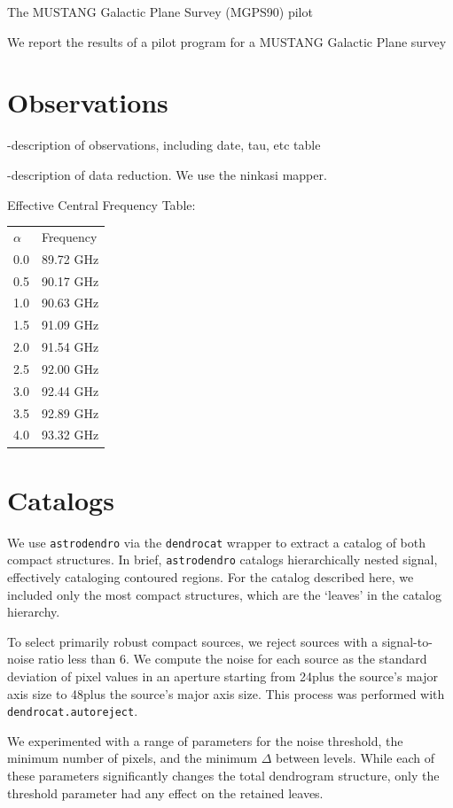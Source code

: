 \documentclass[twocolumn]{aastex62}
\begin{document}
The MUSTANG Galactic Plane Survey (MGPS90) pilot

We report the results of a pilot program for a MUSTANG Galactic Plane survey

\section{Observations}

-description of observations, including date, tau, etc table

-description of data reduction.  We use the ninkasi mapper.


Effective Central Frequency Table:

\begin{tabular}{ll}
$\alpha$ & Frequency \\
0.0 & 89.72 GHz \\
0.5 & 90.17 GHz \\
1.0 & 90.63 GHz \\
1.5 & 91.09 GHz \\
2.0 & 91.54 GHz \\
2.5 & 92.00 GHz \\
3.0 & 92.44 GHz \\
3.5 & 92.89 GHz \\
4.0 & 93.32 GHz 
\end{tabular}

\section{Catalogs}

We use \texttt{astrodendro} via the \texttt{dendrocat} wrapper to extract a
catalog of both compact structures.  In brief, \texttt{astrodendro} catalogs
hierarchically nested signal, effectively cataloging contoured regions.  For
the catalog described here, we included only the most compact structures, which
are the `leaves' in the catalog hierarchy.

To select primarily robust compact sources, we reject sources with a signal-to-noise
ratio less than 6.  We compute the noise for each source as the standard deviation
of pixel values in an aperture starting from 24\arcsec plus the source's major axis
size to 48\arcsec plus the source's major axis size.  This process was performed with
\texttt{dendrocat.autoreject}.

We experimented with a range of parameters for the noise threshold, the minimum
number of pixels, and the minimum $\Delta$ between levels.  While each of these
parameters significantly changes the total dendrogram structure, only the
threshold parameter had any effect on the retained leaves.
\end{document}
